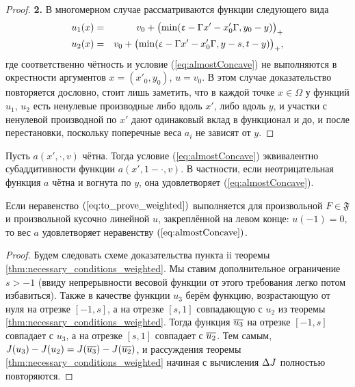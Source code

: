 \begin{proof}
\textbf{2.}
В многомерном случае рассматриваются функции следующего вида
\begin{eqnarray*}
u_1(x) &=& v_0 + \bigl( \min( \eps - \abs{x' - x'_0}, y_0 - y ) \bigr)_+ \\
u_2(x) &=& v_0 + \bigl( \min( \eps - \abs{x' - x'_0}, y - s, t - y ) \bigr)_+,
\end{eqnarray*}
где соответственно чётность и условие (\ref{eq:almostConcave}) не выполняются в окрестности аргументов $x = (x'_0, y_0)$, $u = v_0$.
В этом случае доказательство повторяется дословно, стоит лишь заметить, что в каждой точке $x \in \Omega$ у функций
$u_1$, $u_2$ есть ненулевые производные либо вдоль $x'$, либо вдоль $y$, и участки с ненулевой производной по $x'$
дают одинаковый вклад в функционал и до, и после перестановки, поскольку поперечные веса $a_i$ не зависят от $y$.
\end{proof}

\begin{rem}
Пусть $a(x', \cdot, v)$ чётна.
Тогда условие (\ref{eq:almostConcave}) эквивалентно субаддитивности функции $a(x', 1 - \cdot, v)$.
В частности, если неотрицательная функция $a$ чётна и вогнута по $y$, она удовлетворяет (\ref{eq:almostConcave}).
\end{rem}

\begin{thm}
Если неравенство $(\ref{eq:to_prove_weighted})$ выполняется для произвольной $F \in \mathfrak{F}$
и произвольной кусочно линейной $u$, закреплённой на левом конце: $u( -1 ) = 0$,
то вес $a$ удовлетворяет неравенству $(\ref{eq:almostConcave})$.
\end{thm}

\begin{proof}
Будем следовать схеме доказательства пункта ii теоремы \ref{thm:necessary_conditions_weighted}.
Мы ставим дополнительное ограничение $s > -1$
(ввиду непрерывности весовой функции от этого требования легко потом избавиться).
Также в качестве функции $u_3$ берём функцию, возрастающую от нуля на отрезке $[-1, s]$,
а на отрезке $[s, 1]$ совпадающую с $u_2$ из теоремы \ref{thm:necessary_conditions_weighted}.
Тогда функция $\mon{u_3}$ на отрезке $[-1, s]$ совпадает с $u_3$, а на отрезке $[s, 1]$ совпадает с $\mon{u_2}$.
Тем самым, $\IWg(u_3) - \IWg(u_2) = \IWg(\mon{u_3}) - \IWg(\mon{u_2})$,
и рассуждения теоремы \ref{thm:necessary_conditions_weighted} начиная с вычисления $\Delta J$ полностью повторяются.
\end{proof}
